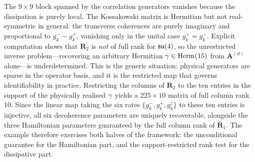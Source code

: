 \documentclass[handoutsbeamer.tex]{subfiles}
\begin{document}
\begin{frame}
{The $9\times9$ block spanned by the correlation generators vanishes because the dissipation is purely local. The Kossakowski matrix is Hermitian but not real-symmetric in general: the transverse coherences are purely imaginary and proportional to $g_k^--g_k^+$, vanishing only in the unital case $g_k^+=g_k^-$. Explicit computation shows that $\mathbf{R}_{2}$ is \emph{not} of full rank for $\liesu[4]$, so the unrestricted inverse problem---recovering an arbitrary Hermitian $\Koss\in\Herm[15]$ from $\mathbf{A}^{(d)}$ alone---is underdetermined. This is the generic situation: physical generators are sparse in the operator basis, and it is the restricted map that governs identifiability in practice. Restricting the columns of $\mathbf{R}_{2}$ to the ten entries in the support of the physically realised $\Koss$ yields a $225\times 10$ matrix of full column rank $10$. Since the linear map taking the six rates $\{g_k^{-},g_k^{+},g_k^{z}\}$ to these ten entries is injective, all six decoherence parameters are uniquely recoverable, alongside the three Hamiltonian parameters guaranteed by the full column rank of $\mathbf{R}_{1}$. The example therefore exercises both halves of the framework: the unconditional guarantee for the Hamiltonian part, and the support-restricted rank test for the dissipative part.}
\end{frame}
\end{document}
